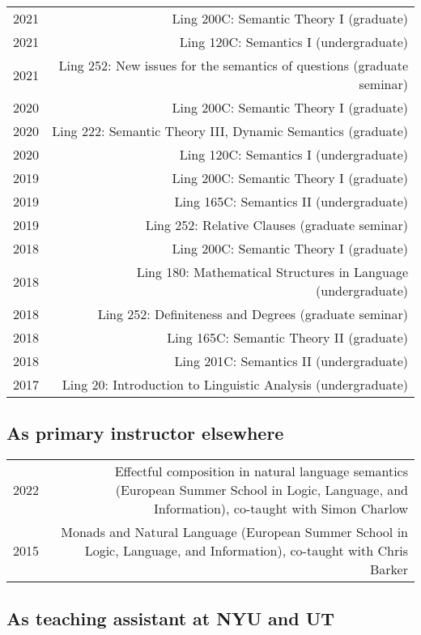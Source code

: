 \documentclass[12pt]{article}
\begin{document}
\begin{longtable}{LR}
  2021 & Ling 200C: Semantic Theory I (graduate)\\
  2021 & Ling 120C: Semantics I (undergraduate)\\
  2021 & Ling 252: New issues for the semantics of questions (graduate seminar)\\
  2020 & Ling 200C: Semantic Theory I (graduate)\\
  2020 & Ling 222: Semantic Theory III, Dynamic Semantics (graduate)\\
  2020 & Ling 120C: Semantics I (undergraduate)\\
  2019 & Ling 200C: Semantic Theory I (graduate)\\
  2019 & Ling 165C: Semantics II (undergraduate)\\
  2019 & Ling 252: Relative Clauses (graduate seminar)\\
  2018 & Ling 200C: Semantic Theory I (graduate)\\
  2018 & Ling 180: Mathematical Structures in Language (undergraduate)\\
  2018 & Ling 252: Definiteness and Degrees (graduate seminar)\\
  2018 & Ling 165C: Semantic Theory II (graduate)\\
  2018 & Ling 201C: Semantics II (undergraduate)\\
  2017 & Ling 20: Introduction to Linguistic Analysis (undergraduate)
\end{longtable}

\subsection*{As primary instructor elsewhere}%

\begin{longtable}{LR}
  2022 & Effectful composition in natural language semantics (European Summer
         School in Logic, Language, and Information), co-taught with Simon
         Charlow\\
  2015 & Monads and Natural Language (European Summer School in Logic, Language,
         and Information), co-taught with Chris Barker
\end{longtable}

\subsection*{As teaching assistant at NYU and UT}
\end{document}
